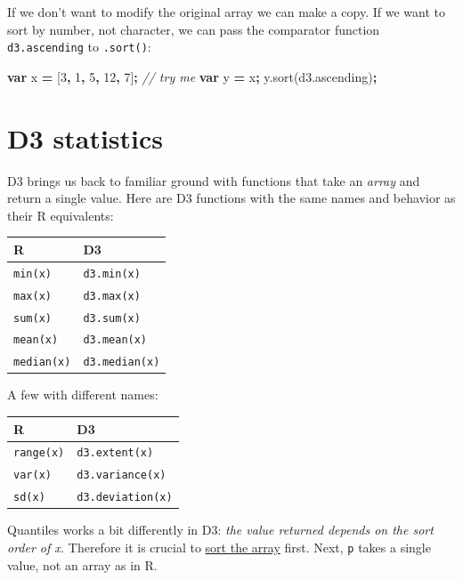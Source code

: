 \documentclass[openany]{book}
\newenvironment{Shaded}{\begin{snugshade}}{\end{snugshade}}
\newcommand{\AttributeTok}[1]{\textcolor[rgb]{0.77,0.63,0.00}{#1}}
\newcommand{\CommentTok}[1]{\textcolor[rgb]{0.56,0.35,0.01}{\textit{#1}}}
\newcommand{\DecValTok}[1]{\textcolor[rgb]{0.00,0.00,0.81}{#1}}
\newcommand{\KeywordTok}[1]{\textcolor[rgb]{0.13,0.29,0.53}{\textbf{#1}}}
\newcommand{\NormalTok}[1]{#1}
\newcommand{\OperatorTok}[1]{\textcolor[rgb]{0.81,0.36,0.00}{\textbf{#1}}}
\newcommand{\VariableTok}[1]{\textcolor[rgb]{0.00,0.00,0.00}{#1}}
\begin{document}
If we don't want to modify the original array we can make a copy. If we want to sort by number, not character, we can pass the comparator function \texttt{d3.ascending} to \texttt{.sort()}:

\begin{Shaded}
\begin{Highlighting}[]
\KeywordTok{var}\NormalTok{ x }\OperatorTok{=}\NormalTok{ [}\DecValTok{3}\OperatorTok{,} \DecValTok{1}\OperatorTok{,} \DecValTok{5}\OperatorTok{,} \DecValTok{12}\OperatorTok{,} \DecValTok{7}\NormalTok{]}\OperatorTok{;}     \CommentTok{// try me}
\KeywordTok{var}\NormalTok{ y }\OperatorTok{=}\NormalTok{ x}\OperatorTok{;}
\VariableTok{y}\NormalTok{.}\AttributeTok{sort}\NormalTok{(}\VariableTok{d3}\NormalTok{.}\AttributeTok{ascending}\NormalTok{)}\OperatorTok{;}
\end{Highlighting}
\end{Shaded}

\hypertarget{d3-statistics}{%
\section{D3 statistics}\label{d3-statistics}}

D3 brings us back to familiar ground with functions that take an \emph{array} and return a single value. Here are D3 functions with the same names and behavior as their R equivalents:

\begin{longtable}[]{@{}ll@{}}
\toprule
R & D3\tabularnewline
\midrule
\endhead
\texttt{min(x)} & \texttt{d3.min(x)}\tabularnewline
\texttt{max(x)} & \texttt{d3.max(x)}\tabularnewline
\texttt{sum(x)} & \texttt{d3.sum(x)}\tabularnewline
\texttt{mean(x)} & \texttt{d3.mean(x)}\tabularnewline
\texttt{median(x)} & \texttt{d3.median(x)}\tabularnewline
\bottomrule
\end{longtable}

A few with different names:

\begin{longtable}[]{@{}ll@{}}
\toprule
R & D3\tabularnewline
\midrule
\endhead
\texttt{range(x)} & \texttt{d3.extent(x)}\tabularnewline
\texttt{var(x)} & \texttt{d3.variance(x)}\tabularnewline
\texttt{sd(x)} & \texttt{d3.deviation(x)}\tabularnewline
\bottomrule
\end{longtable}

Quantiles works a bit differently in D3: \emph{the value returned depends on the sort order of x.} Therefore it is crucial to \href{just-enough-js.html\#sorting}{sort the array} first. Next, \texttt{p} takes a single value, not an array as in R.
\end{document}
